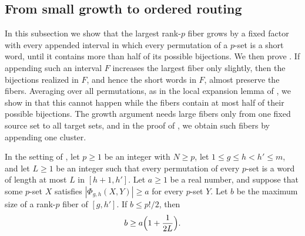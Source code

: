 \documentclass[fontsize=12pt,leading=14pt]{fullpaper}
\begin{document}
\subsection{From small growth to ordered routing}\label{sec:s3-growth}

In this subsection we show that the largest rank-$p$ fiber grows by a fixed factor with every appended interval in which every permutation of a $p$-set is a short word, until it contains more than half of its possible bijections.
We then prove .
If appending such an interval $F$ increases the largest fiber only slightly, then the bijections realized in $F$, and hence the short words in $F$, almost preserve the fibers.
Averaging over all permutations, as in the local expansion lemma of \textcite{Babai91}, we show in  that this cannot happen while the fibers contain at most half of their possible bijections.
The growth argument needs large fibers only from one fixed source set to all target sets, and in the proof of , we obtain such fibers by appending one cluster.

\begin{lemma}\label{lem:s3-growth}
  In the setting of , let $p\ge1$ be an integer with $N\ge p$, let $1\le g\le h<h'\le m$, and let $L\ge1$ be an integer such that every permutation of every $p$-set is a word of length at most $L$ in $[h+1,h']$.
  Let $a\ge1$ be a real number, and suppose that some $p$-set $X$ satisfies $|\Phi_{g,h}(X,Y)|\ge a$ for every $p$-set $Y$.
  Let $b$ be the maximum size of a rank-$p$ fiber of $[g,h']$.
  If $b\le p!/2$, then
  \[
    b\ge a\Bigl(1+\frac1{2L}\Bigr).
  \]
\end{lemma}
\end{document}
